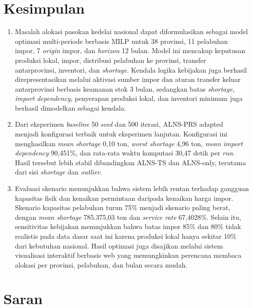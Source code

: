 \documentclass{file/TA-ITS}
\theoremstyle{definition}
\theoremstyle{definition}
\theoremstyle{plain}
\begin{document}
\section{Kesimpulan}

\begin{enumerate}
    \item Masalah alokasi pasokan kedelai nasional dapat diformulasikan sebagai model optimasi multi-periode berbasis MILP untuk 38 provinsi, 11 pelabuhan impor, 7 \textit{origin} impor, dan \textit{horizon} 12 bulan. Model ini mencakup keputusan produksi lokal, impor, distribusi pelabuhan ke provinsi, transfer antarprovinsi, inventori, dan \textit{shortage}. Kendala logika kebijakan juga berhasil direpresentasikan melalui aktivasi sumber impor dan aturan transfer keluar antarprovinsi berbasis keamanan stok 3 bulan, sedangkan batas \textit{shortage}, \textit{import dependency}, penyerapan produksi lokal, dan inventori minimum juga berhasil dimodelkan sebagai kendala.

    \item Dari eksperimen \textit{baseline} 50 \textit{seed} dan 500 iterasi, ALNS-PRS adapted menjadi konfigurasi terbaik untuk eksperimen lanjutan. Konfigurasi ini menghasilkan \textit{mean shortage} 0{,}10 ton, \textit{worst shortage} 4{,}96 ton, \textit{mean import dependency} 90{,}451\%, dan rata-rata waktu komputasi 30{,}47 detik per \textit{run}. Hasil tersebut lebih stabil dibandingkan ALNS-TS dan ALNS-only, terutama dari sisi \textit{shortage} dan \textit{outlier}.

    \item Evaluasi skenario menunjukkan bahwa sistem lebih rentan terhadap gangguan kapasitas fisik dan kenaikan permintaan daripada kenaikan harga impor. Skenario kapasitas pelabuhan turun 75\% menjadi skenario paling berat, dengan \textit{mean shortage} 785.375{,}03 ton dan \textit{service rate} 67{,}4028\%. Selain itu, sensitivitas kebijakan menunjukkan bahwa batas impor 85\% dan 80\% tidak realistis pada data dasar saat ini karena produksi lokal hanya sekitar 10\% dari kebutuhan nasional. Hasil optimasi juga disajikan melalui sistem visualisasi interaktif berbasis web yang memungkinkan perencana membaca alokasi per provinsi, pelabuhan, dan bulan secara mudah.
\end{enumerate}

\section{Saran}
\end{document}

